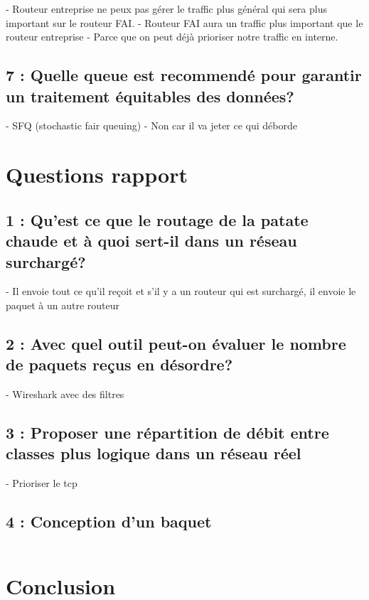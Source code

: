 \documentclass{article}
\begin{document}
- Routeur entreprise ne peux pas gérer le traffic plus général qui sera plus important sur le routeur FAI.
- Routeur FAI aura un traffic plus important que le routeur entreprise
- Parce que on peut déjà prioriser notre traffic en interne.

\subsection{7 : Quelle queue est recommendé pour garantir un traitement équitables des données?}

- SFQ (stochastic fair queuing)
- Non car il va jeter ce qui déborde

\section{Questions rapport}

\subsection{1 : Qu'est ce que le routage de la patate chaude et à quoi sert-il dans un réseau surchargé?}

- Il envoie tout ce qu'il reçoit et s'il y a un routeur qui est surchargé, il envoie le paquet à un autre routeur

\subsection{2 : Avec quel outil peut-on évaluer le nombre de paquets reçus en désordre?}

- Wireshark avec des filtres

\subsection{3 : Proposer une répartition de débit entre classes plus logique dans un réseau réel}

- Prioriser le tcp

\subsection{4 : Conception d'un baquet}

\begin{verbatim}

\end{verbatim}


\section{Conclusion}



\printbibliography
\end{document}
